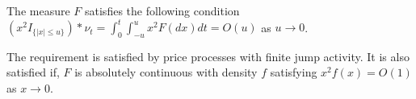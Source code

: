 \begin{ass} \label{as:nu}
  \mbox{}
  The \levy measure $F$ satisfies the following condition
  $(x^2I_{\{\vert x \vert \le u\}})\ast \nu_t = \int_0^t \int_{-u}^{u} x^2 F(dx) dt = O(u)$ as $u \to 0$.
\end{ass}
\begin{remark}

  The  requirement  is satisfied by price processes with finite jump activity. It is also satisfied if, $F$ is absolutely continuous with density $f$ satisfying $x^2 f(x) = O(1)$ as $x \to 0$.
\end{remark}
